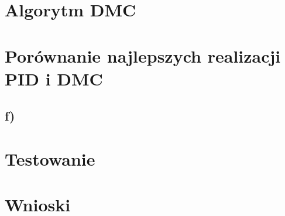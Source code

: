 \documentclass[12pt, a4paper]{article}
\begin{document}
\section{Algorytm DMC}

\section{Porównanie najlepszych realizacji PID i DMC}

\subsection{f) }
\begin{figure}[h!]
\end{figure}

\section{Testowanie}

\section{Wnioski}
\end{document}
